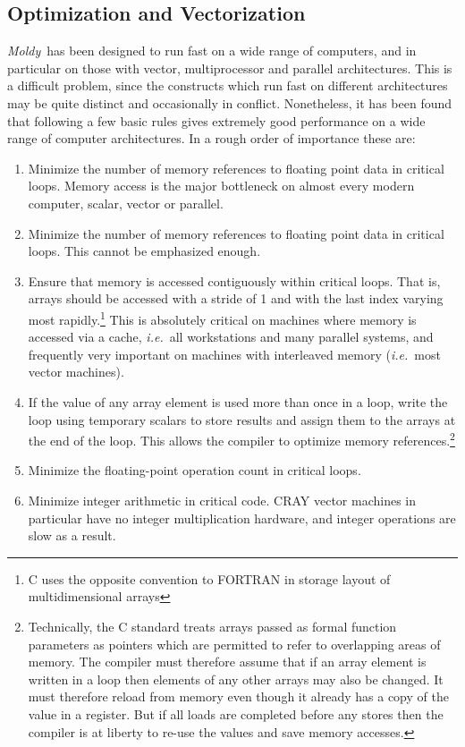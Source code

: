 \documentclass[a4paper,twoside]{report}
\newcommand{\moldy}{\emph{Moldy}}
\newcommand{\ie}{\emph{i.e.}}
\begin{document}
\subsection{Optimization and Vectorization}
\moldy\ has been designed to run fast on a wide range of computers,
and in particular on those with vector, multiprocessor and parallel
architectures. This is a difficult problem, since the constructs which
run fast on different architectures may be quite distinct and
occasionally in conflict.  Nonetheless, it has been found that
following a few basic rules gives extremely good performance on a wide
range of computer architectures.  In a rough order of importance these
are:
\begin{enumerate}
\item Minimize the number of memory references to floating point data
  in critical loops.  Memory access is the major bottleneck on almost
  every modern computer, scalar, vector or parallel.
\item Minimize the number of memory references to floating point data
  in critical loops.  This cannot be emphasized enough.
\item Ensure that memory is accessed contiguously within critical
  loops. That is, arrays should be accessed with a stride of 1 and
  with the last index varying most rapidly.\footnote{C uses the
    opposite convention to FORTRAN in storage layout of
    multidimensional arrays}  This is absolutely critical on machines
  where memory is accessed via a cache, \ie\ all workstations and many
  parallel systems, and frequently very important on machines with
  interleaved memory (\ie\ most vector machines).
\item If the value of any array element is used more than once in a
  loop, write the loop using temporary scalars to store results and
  assign them to the arrays at the end of the loop. This allows the
  compiler to optimize memory references.\footnote{Technically, the C
    standard treats arrays passed as formal function parameters as
    pointers which are permitted to refer to overlapping areas of
    memory.  The compiler must therefore assume that if an array
    element is written in a loop then elements of any other arrays may
    also be changed.  It must therefore reload from memory even though
    it already has a copy of the value in a register. But if all loads
    are completed before any stores then the compiler is at liberty to
    re-use the values and save memory accesses.}
\item Minimize the floating-point operation count in critical loops.
\item Minimize integer arithmetic in critical code.  CRAY vector
  machines in particular have no integer multiplication hardware,
  and integer operations are slow as a result.
\end{enumerate}
\end{document}
